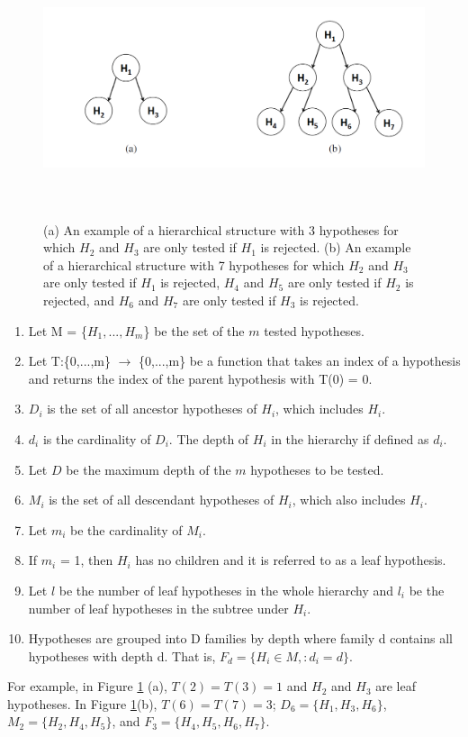 \documentclass{article}
\begin{document}
\begin{figure}[H]
	\centering
	\includegraphics[height=3in]{"hierarchical structure"}
	\caption{(a) An example of a hierarchical structure with 3 hypotheses for which $H_2$ and $H_3$ are only tested if $H_1$ is rejected. (b) An example of a hierarchical structure with 7 hypotheses for which $H_2$ and $H_3$ are only tested if $H_1$ is rejected, $H_4$ and $H_5$ are only tested if $H_2$ is rejected, and $H_6$ and $H_7$ are only tested if $H_3$ is rejected. }
	\label{fig:hierarchical-structure}
\end{figure}

\begin{enumerate}
	\item Let M = \{$H_1,...,H_m$\} be the set of the $m$ tested hypotheses.
	\item Let T:\{0,...,m\} $\rightarrow$ \{0,...,m\} be a function that takes an index of a hypothesis and returns the index of the parent hypothesis with T(0) = 0.
	\item $D_i$ is the set of all ancestor hypotheses of $H_i$, which includes $H_i$.
	\item $d_i$ is the cardinality of $D_i$. The depth of $H_i$ in the hierarchy if defined as $d_i$.
	\item Let $D$ be the maximum depth of the $m$ hypotheses to be tested.
	\item $M_i$ is the set of all descendant hypotheses of $H_i$, which also includes $H_i$.
	\item Let $m_i$ be the cardinality of $M_i$.
	\item If $m_i$ = 1, then $H_i$ has no children and it is referred to as a leaf hypothesis.
	\item Let $l$ be the number of leaf hypotheses in the whole hierarchy and $l_i$ be the number of leaf hypotheses in the subtree under $H_i$.
	\item Hypotheses are grouped into D families by depth where
	family d contains all hypotheses with depth d. That is, $F_d = \{H_i \in M,: d_i = d\}$.
	
\end{enumerate}
For example, in Figure \ref{fig:hierarchical-structure} (a), $T(2) = T(3) = 1$ and $H_2$ and $H_3$ are leaf hypotheses. In Figure \ref{fig:hierarchical-structure}(b),
$T(6) = T(7) = 3$; $D_6 = \{H_1,H_3,H_6\}$, $M_2 = \{H_2, H_4, H_5\}$, and $F_3 = \{H_4,H_5,H_6,H_7\}$.
\end{document}
